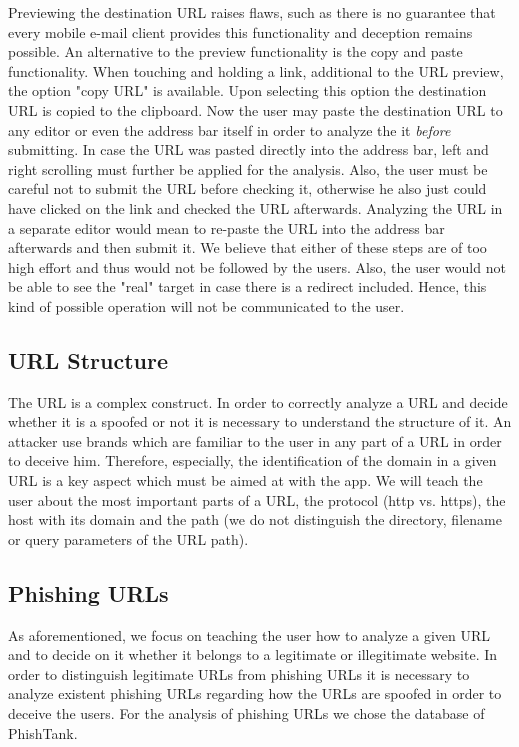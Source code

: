 \begin{description}[leftmargin=0cm]
	\item[Copy and Paste URL] Previewing the destination URL raises flaws, such as there is no guarantee that every mobile e-mail client provides this functionality and deception remains possible. 
An alternative to the preview functionality is the copy and paste functionality.
When touching and holding a link, additional to the URL preview, the option "copy URL" is available.
Upon selecting this option the destination URL is copied to the clipboard.
Now the user may paste the destination URL to any editor or even the address bar itself in order to analyze the it \textit{before} submitting.
In case the URL was pasted directly into the address bar, left and right scrolling must further be applied for the analysis. 
Also, the user must be careful not to submit the URL before checking it, otherwise he also just could have clicked on the link and checked the URL afterwards.
Analyzing the URL in a separate editor would mean to re-paste the URL into the address bar afterwards and then submit it.
We believe that either of these steps are of too high effort and thus would not be followed by the users.
Also, the user would not be able to see the "real" target in case there is a redirect included. 
Hence, this kind of possible operation will not be communicated to the user.
\end{description}

\subsection{URL Structure}
\label{s:url_structure}
The URL is a complex construct. 
In order to correctly analyze a URL and decide whether it is a spoofed or not it is necessary to understand the structure of it. 
An attacker use brands which are familiar to the user in any part of a URL in order to deceive him. 
Therefore, especially, the identification of the domain in a given URL is a key aspect which must be aimed at with the app. 
We will teach the user about the most important parts of a URL, the protocol (http vs. https), the host with its domain and the path (we do not distinguish the directory, filename or query parameters of the URL path).

\subsection{Phishing URLs}
As aforementioned, we focus on teaching the user how to analyze a given URL and to decide on it whether it belongs to a legitimate or illegitimate website.
 In order to distinguish legitimate URLs from phishing URLs it is necessary to analyze existent phishing URLs regarding how the URLs are spoofed in order to deceive the users.
 For the analysis of phishing URLs we chose the database of PhishTank.

